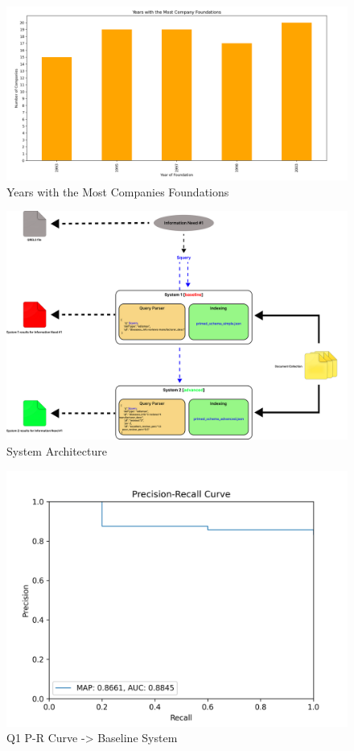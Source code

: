 \documentclass[sigconf]{acmart}
\begin{document}
\begin{figure}[H]
	\centering
	\includegraphics[width=\linewidth]{graphic7.png}
	\caption{Years with the Most Companies Foundations}
	\label{fig:companyYears}
  \end{figure}

\begin{figure}[H]
	\centering
	\includegraphics[width=\linewidth]{system_arch.png}
	\caption{System Architecture}
	\label{fig:sysArchitecture}
  \end{figure}

\begin{figure}[H]
  \centering
  \includegraphics[width=0.8\linewidth]{precision_recall_q1b.png}
  \caption{Q1 P-R Curve -> Baseline System}
  \label{fig:precisionRecallBaseline1}
\end{figure}
\end{document}
